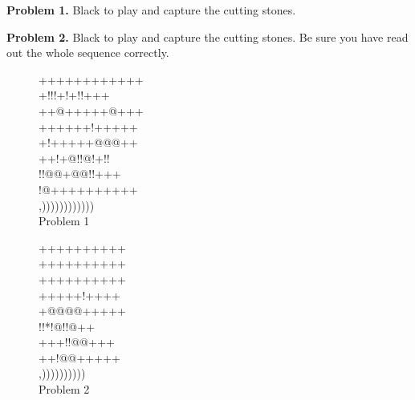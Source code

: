 \documentclass[mcrownvopaper,10pt,twopage,onecolumn,draft,showtrims]{memoir}
\begin{document}
\noindent
\textbf{Problem 1.} Black to play and capture the cutting stones.

\noindent
\textbf{Problem 2.} Black to play and capture the cutting stones. Be sure you
have read out the whole sequence correctly.

\begin{figure}[ht]
    \begin{minipage}[c]{0.57\linewidth}
        \centering    
        {\gnos%
        ++++++++++++\\
        +!!!+!+!!+++\\
        ++@+++++@+++\\
        ++++++!+++++\\
        +!+++++@@@++\\
        ++!+@!!@!+!!\\
        !!@@+@@!!+++\\
        !@++++++++++\\
        ,))))))))))))\\
        }
        Problem 1
    \end{minipage}%
    \begin{minipage}[c]{0.43\linewidth}
        \centering    
        {\gnos%
        ++++++++++\\
        ++++++++++\\
        ++++++++++\\
        +++++!++++\\
        +@@@@+++++\\
        !!*!@!!@++\\
        +++!!@@+++\\
        ++!@@+++++\\
        ,))))))))))\\
        }
        Problem 2
    \end{minipage}
\end{figure}
\newpage
\end{document}
